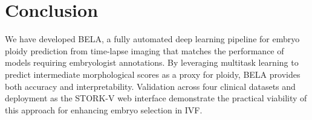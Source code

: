 \documentclass[11pt]{article}
\begin{document}
\section{Conclusion}

We have developed BELA, a fully automated deep learning pipeline for embryo ploidy prediction from time-lapse imaging that matches the performance of models requiring embryologist annotations. By leveraging multitask learning to predict intermediate morphological scores as a proxy for ploidy, BELA provides both accuracy and interpretability. Validation across four clinical datasets and deployment as the STORK-V web interface demonstrate the practical viability of this approach for enhancing embryo selection in IVF.



\end{document}
